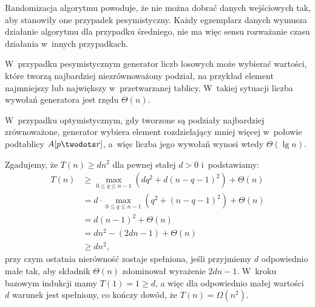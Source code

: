 
\exercise %
Randomizacja algorytmu powoduje, że nie można dobrać danych wejściowych tak, aby stanowiły one przypadek pesymistyczny. Każdy egzemplarz danych wymusza działanie algorytmu dla przypadku średniego, nie ma więc sensu rozważanie czasu działania w~innych przypadkach.

\exercise %
W~przypadku pesymistycznym generator liczb losowych może wybierać wartości, które tworzą najbardziej niezrównoważony podział, na przykład element najmniejszy lub największy w~przetwarzanej tablicy. W~takiej sytuacji liczba wywołań generatora jest rzędu $\Theta(n)$.

W~przypadku optymistycznym, gdy tworzone są podziały najbardziej zrównoważone, generator wybiera element rozdzielający mniej więcej w~połowie podtablicy $A[p\twodots r]$, a~więc liczba jego wywołań wynosi wtedy $\Theta(\lg n)$.


\exercise %
Zgadujemy, że $T(n)\ge dn^2$ dla pewnej stałej $d>0$ i~podstawiamy:
\begin{align*}
	T(n) &\ge \max_{0\le q\le n-1}(dq^2+d(n-q-1)^2)+\Theta(n) \\
	&= d\cdot\max_{0\le q\le n-1}(q^2+(n-q-1)^2)+\Theta(n) \\
	&= d(n-1)^2+\Theta(n) \\
	&= dn^2-(2dn-1)+\Theta(n) \\
	&\ge dn^2,
\end{align*}
przy czym ostatnia nierówność zostaje spełniona, jeśli przyjmiemy $d$ odpowiednio małe tak, aby składnik $\Theta(n)$ zdominował wyrażenie $2dn-1$. W~kroku bazowym indukcji mamy $T(1)=1\ge d$, a więc dla odpowiednio małej wartości $d$ warunek jest spełniony, co kończy dowód, że $T(n)=\Omega(n^2)$.


